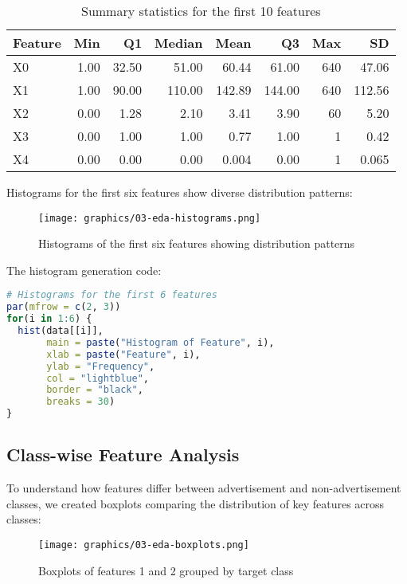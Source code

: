 \begin{table}[H]
\centering
\caption{Summary statistics for the first 10 features}
\label{tab:feature-stats}
\begin{tabular}{lrrrrrrr}
\toprule
\textbf{Feature} & \textbf{Min} & \textbf{Q1} & \textbf{Median} & \textbf{Mean} & \textbf{Q3} & \textbf{Max} & \textbf{SD} \\
\midrule
X0 & 1.00 & 32.50 & 51.00 & 60.44 & 61.00 & 640 & 47.06 \\
X1 & 1.00 & 90.00 & 110.00 & 142.89 & 144.00 & 640 & 112.56 \\
X2 & 0.00 & 1.28 & 2.10 & 3.41 & 3.90 & 60 & 5.20 \\
X3 & 0.00 & 1.00 & 1.00 & 0.77 & 1.00 & 1 & 0.42 \\
X4 & 0.00 & 0.00 & 0.00 & 0.004 & 0.00 & 1 & 0.065 \\
\bottomrule
\end{tabular}
\end{table}

Histograms for the first six features show diverse distribution patterns:

\begin{figure}[H]
\centering
\texttt{[image: graphics/03-eda-histograms.png]}
\caption{Histograms of the first six features showing distribution patterns}
\label{fig:histograms}
\end{figure}

The histogram generation code:

\begin{lstlisting}[language=R]
# Histograms for the first 6 features
par(mfrow = c(2, 3))
for(i in 1:6) {
  hist(data[[i]], 
       main = paste("Histogram of Feature", i),
       xlab = paste("Feature", i),
       ylab = "Frequency",
       col = "lightblue",
       border = "black",
       breaks = 30)
}
\end{lstlisting}

\subsection{Class-wise Feature Analysis}
To understand how features differ between advertisement and non-advertisement classes, we created boxplots comparing the distribution of key features across classes:

\begin{figure}[H]
\centering
\texttt{[image: graphics/03-eda-boxplots.png]}
\caption{Boxplots of features 1 and 2 grouped by target class}
\label{fig:boxplots}
\end{figure}

